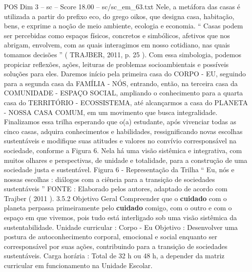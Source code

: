 \begin{textsample}{POS Dim 3 – sc – Score 18.00 – sc/sc\_em\_63.txt}
Nele, a metáfora das casas é utilizada a partir do prefixo eco, do grego oikos, que designa casa, habitação, bens, e exprime a noção de meio ambiente, ecologia e economia. “ Casas podem ser percebidas como espaços físicos, concretos e simbólicos, afetivos que nos abrigam, envolvem, com as quais interagimos em nosso cotidiano, nas quais tomamos decisões ” ( TRAJBER, 2011, p. 25 ).
Com essa simbologia, podemos propiciar reflexões, ações, leituras de problemas socioambientais e possíveis soluções para eles.
Daremos início pela primeira casa do CORPO - EU, seguindo para a segunda casa da FAMÍLIA - NÓS, entrando, então, na terceira casa da COMUNIDADE - ESPAÇO SOCIAL, ampliando o conhecimento para a quarta casa do TERRITÓRIO - ECOSSISTEMA, até alcançarmos a casa do PLANETA - NOSSA CASA COMUM, em um movimento que busca integralidade.
Finalizamos essa trilha esperando que o(a) estudante, após vivenciar todas as cinco casas, adquira conhecimentos e habilidades, ressignificando novas escolhas sustentáveis e modifique suas atitudes e valores no convívio corresponsável na sociedade, conforme a Figura 6.
Nela há uma visão sistêmica e integrativa, com muitos olhares e perspectivas, de unidade e totalidade, para a construção de uma sociedade justa e sustentável.
Figura 6 - Representação da Trilha “ Eu, nós e nossas escolhas : diálogos com a ciência para a transição de sociedades sustentáveis ” FONTE : Elaborado pelos autores, adaptado de acordo com Trajber ( 2011 ). 3.5.2 Objetivo Geral Compreender que o \textbf{cuidado} com o planeta perpassa primeiramente pelo \textbf{cuidado} comigo, com o outro e com o espaço em que vivemos, pois tudo está interligado sob uma visão sistêmica da sustentabilidade.
Unidade curricular : Corpo - Eu Objetivo : Desenvolver uma postura de autoconhecimento corporal, emocional e social enquanto ser corresponsável por suas ações, contribuindo para a transição de sociedades sustentáveis.
Carga horária : Total de 32 h ou 48 h, a depender da matriz curricular em funcionamento na Unidade Escolar.

\end{textsample}
